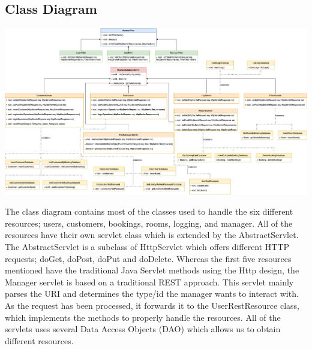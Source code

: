 \subsection{Class Diagram}

\includegraphics[width=\textwidth]{images/Class_Diagram.png}

The class diagram contains most of the classes used to handle the six different resources; users, customers, bookings, rooms, logging, and manager. All of the resources have their own servlet class which is extended by the AbstractServlet. The AbstractServlet is a subclass of HttpServlet which offers different HTTP requests; doGet, doPost, doPut and doDelete. Whereas the first five resources mentioned have the traditional Java Servlet methods using the Http design, the Manager servlet is based on a traditional REST approach. This servlet mainly parses the URI and determines the type/id the manager wants to interact with. As the request has been processed, it forwards it to the UserRestResource class, which implements the methods to properly handle the resources. All of the servlets uses several Data Access Objects (DAO) which allows us to obtain different resources. 